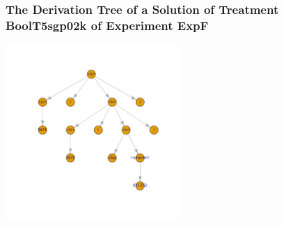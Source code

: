  \begin{frame}
 \frametitle{ The Derivation Tree of a Solution of Treatment BoolT5sgp02k of Experiment ExpF }
 \begin{center}
\includegraphics[width=0.5\textwidth, angle=0]
{ExpFDerivationTreeFigure000.pdf}
 \end{center}
 \label{report/ExpFDerivationTreeFigure000.pdf}  
 \end{frame}

